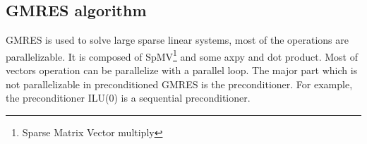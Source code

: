 \subsection{GMRES algorithm}
GMRES is used to solve large sparse linear systems, most of the operations are parallelizable.
%
It is composed of SpMV\footnote{Sparse Matrix Vector multiply} and some axpy and dot product.
%
Most of vectors operation can be parallelize with a parallel loop.
%
The major part which is not parallelizable in preconditioned GMRES is the preconditioner.
%
For example, the preconditioner ILU(0) is a sequential preconditioner.




